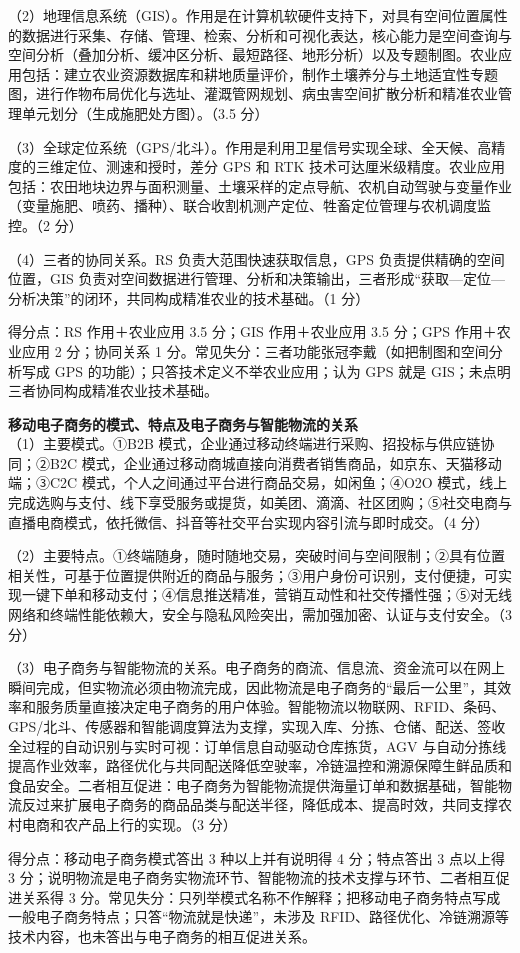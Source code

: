 \documentclass[a4paper,11pt]{article}
\begin{document}
（2）地理信息系统（GIS）。作用是在计算机软硬件支持下，对具有空间位置属性的数据进行采集、存储、管理、检索、分析和可视化表达，核心能力是空间查询与空间分析（叠加分析、缓冲区分析、最短路径、地形分析）以及专题制图。农业应用包括：建立农业资源数据库和耕地质量评价，制作土壤养分与土地适宜性专题图，进行作物布局优化与选址、灌溉管网规划、病虫害空间扩散分析和精准农业管理单元划分（生成施肥处方图）。（3.5 分）

（3）全球定位系统（GPS/北斗）。作用是利用卫星信号实现全球、全天候、高精度的三维定位、测速和授时，差分 GPS 和 RTK 技术可达厘米级精度。农业应用包括：农田地块边界与面积测量、土壤采样的定点导航、农机自动驾驶与变量作业（变量施肥、喷药、播种）、联合收割机测产定位、牲畜定位管理与农机调度监控。（2 分）

（4）三者的协同关系。RS 负责大范围快速获取信息，GPS 负责提供精确的空间位置，GIS 负责对空间数据进行管理、分析和决策输出，三者形成“获取—定位—分析决策”的闭环，共同构成精准农业的技术基础。（1 分）
\begin{analysis}得分点：RS 作用＋农业应用 3.5 分；GIS 作用＋农业应用 3.5 分；GPS 作用＋农业应用 2 分；协同关系 1 分。常见失分：三者功能张冠李戴（如把制图和空间分析写成 GPS 的功能）；只答技术定义不举农业应用；认为 GPS 就是 GIS；未点明三者协同构成精准农业技术基础。\end{analysis}

\q \textbf{移动电子商务的模式、特点及电子商务与智能物流的关系}\\
（1）主要模式。①B2B 模式，企业通过移动终端进行采购、招投标与供应链协同；②B2C 模式，企业通过移动商城直接向消费者销售商品，如京东、天猫移动端；③C2C 模式，个人之间通过平台进行商品交易，如闲鱼；④O2O 模式，线上完成选购与支付、线下享受服务或提货，如美团、滴滴、社区团购；⑤社交电商与直播电商模式，依托微信、抖音等社交平台实现内容引流与即时成交。（4 分）

（2）主要特点。①终端随身，随时随地交易，突破时间与空间限制；②具有位置相关性，可基于位置提供附近的商品与服务；③用户身份可识别，支付便捷，可实现一键下单和移动支付；④信息推送精准，营销互动性和社交传播性强；⑤对无线网络和终端性能依赖大，安全与隐私风险突出，需加强加密、认证与支付安全。（3 分）

（3）电子商务与智能物流的关系。电子商务的商流、信息流、资金流可以在网上瞬间完成，但实物流必须由物流完成，因此物流是电子商务的“最后一公里”，其效率和服务质量直接决定电子商务的用户体验。智能物流以物联网、RFID、条码、GPS/北斗、传感器和智能调度算法为支撑，实现入库、分拣、仓储、配送、签收全过程的自动识别与实时可视：订单信息自动驱动仓库拣货，AGV 与自动分拣线提高作业效率，路径优化与共同配送降低空驶率，冷链温控和溯源保障生鲜品质和食品安全。二者相互促进：电子商务为智能物流提供海量订单和数据基础，智能物流反过来扩展电子商务的商品品类与配送半径，降低成本、提高时效，共同支撑农村电商和农产品上行的实现。（3 分）
\begin{analysis}得分点：移动电子商务模式答出 3 种以上并有说明得 4 分；特点答出 3 点以上得 3 分；说明物流是电子商务实物流环节、智能物流的技术支撑与环节、二者相互促进关系得 3 分。常见失分：只列举模式名称不作解释；把移动电子商务特点写成一般电子商务特点；只答“物流就是快递”，未涉及 RFID、路径优化、冷链溯源等技术内容，也未答出与电子商务的相互促进关系。\end{analysis}
\end{document}
